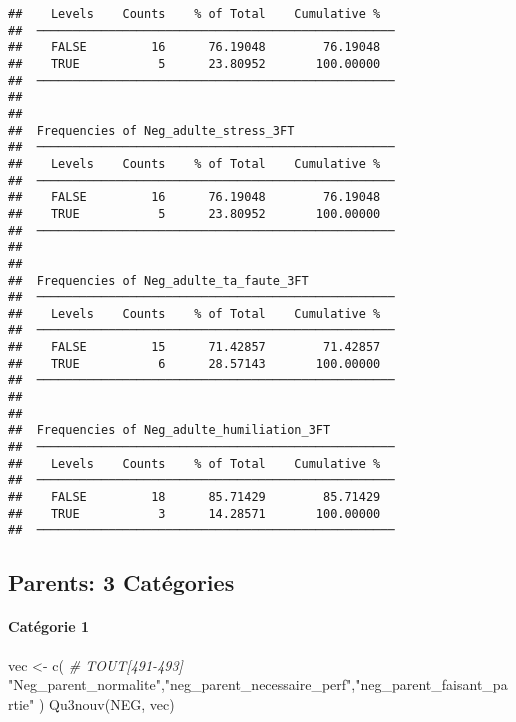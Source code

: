 \documentclass[
]{article}
\newenvironment{Shaded}{\begin{snugshade}}{\end{snugshade}}
\newcommand{\CommentTok}[1]{\textcolor[rgb]{0.56,0.35,0.01}{\textit{#1}}}
\newcommand{\FunctionTok}[1]{\textcolor[rgb]{0.00,0.00,0.00}{#1}}
\newcommand{\NormalTok}[1]{#1}
\newcommand{\OtherTok}[1]{\textcolor[rgb]{0.56,0.35,0.01}{#1}}
\newcommand{\StringTok}[1]{\textcolor[rgb]{0.31,0.60,0.02}{#1}}
\begin{document}
\begin{verbatim}
##    Levels    Counts    % of Total    Cumulative %   
##  ────────────────────────────────────────────────── 
##    FALSE         16      76.19048        76.19048   
##    TRUE           5      23.80952       100.00000   
##  ────────────────────────────────────────────────── 
## 
## 
##  Frequencies of Neg_adulte_stress_3FT               
##  ────────────────────────────────────────────────── 
##    Levels    Counts    % of Total    Cumulative %   
##  ────────────────────────────────────────────────── 
##    FALSE         16      76.19048        76.19048   
##    TRUE           5      23.80952       100.00000   
##  ────────────────────────────────────────────────── 
## 
## 
##  Frequencies of Neg_adulte_ta_faute_3FT             
##  ────────────────────────────────────────────────── 
##    Levels    Counts    % of Total    Cumulative %   
##  ────────────────────────────────────────────────── 
##    FALSE         15      71.42857        71.42857   
##    TRUE           6      28.57143       100.00000   
##  ────────────────────────────────────────────────── 
## 
## 
##  Frequencies of Neg_adulte_humiliation_3FT          
##  ────────────────────────────────────────────────── 
##    Levels    Counts    % of Total    Cumulative %   
##  ────────────────────────────────────────────────── 
##    FALSE         18      85.71429        85.71429   
##    TRUE           3      14.28571       100.00000   
##  ──────────────────────────────────────────────────
\end{verbatim}

\hypertarget{parents-3-catuxe9gories}{%
\subsection{Parents: 3 Catégories}\label{parents-3-catuxe9gories}}

\hypertarget{catuxe9gorie-1-5}{%
\paragraph{Catégorie 1}\label{catuxe9gorie-1-5}}

\begin{Shaded}
\begin{Highlighting}[]
\NormalTok{vec }\OtherTok{\textless{}{-}} \FunctionTok{c}\NormalTok{(   }\CommentTok{\# TOUT[491{-}493]}
  \StringTok{"Neg\_parent\_normalite"}\NormalTok{,}\StringTok{"neg\_parent\_necessaire\_perf"}\NormalTok{,}\StringTok{"neg\_parent\_faisant\_partie"}  
\NormalTok{)}
\FunctionTok{Qu3nouv}\NormalTok{(NEG, vec)}
\end{Highlighting}
\end{Shaded}
\end{document}
